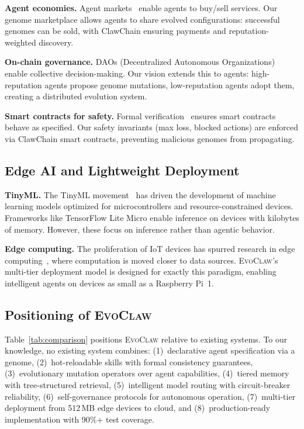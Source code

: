 \documentclass{article}
\newcommand{\evoclaw}{\textsc{EvoClaw}}
\begin{document}
\textbf{Agent economies.} Agent markets~\cite{goertzel2017agi} enable agents to buy/sell services. Our genome marketplace allows agents to share evolved configurations: successful genomes can be sold, with ClawChain ensuring payments and reputation-weighted discovery.

\textbf{On-chain governance.} DAOs (Decentralized Autonomous Organizations)~\cite{buterin2014ethereum} enable collective decision-making. Our vision extends this to agents: high-reputation agents propose genome mutations, low-reputation agents adopt them, creating a distributed evolution system.

\textbf{Smart contracts for safety.} Formal verification~\cite{miller2016simpl} ensures smart contracts behave as specified. Our safety invariants (max loss, blocked actions) are enforced via ClawChain smart contracts, preventing malicious genomes from propagating.

\subsection{Edge AI and Lightweight Deployment}

\textbf{TinyML.} The TinyML movement~\cite{tinyml} has driven the development of machine learning models optimized for microcontrollers and resource-constrained devices. Frameworks like TensorFlow Lite Micro enable inference on devices with kilobytes of memory. However, these focus on inference rather than agentic behavior.

\textbf{Edge computing.} The proliferation of IoT devices has spurred research in edge computing~\cite{shi2016edge}, where computation is moved closer to data sources. \evoclaw{}'s multi-tier deployment model is designed for exactly this paradigm, enabling intelligent agents on devices as small as a Raspberry Pi~1.

\subsection{Positioning of \evoclaw{}}

Table~\ref{tab:comparison} positions \evoclaw{} relative to existing systems. To our knowledge, no existing system combines: (1)~declarative agent specification via a genome, (2)~hot-reloadable skills with formal consistency guarantees, (3)~evolutionary mutation operators over agent capabilities, (4)~tiered memory with tree-structured retrieval, (5)~intelligent model routing with circuit-breaker reliability, (6)~self-governance protocols for autonomous operation, (7)~multi-tier deployment from 512\,MB edge devices to cloud, and (8)~production-ready implementation with 90\%+ test coverage.
\end{document}
